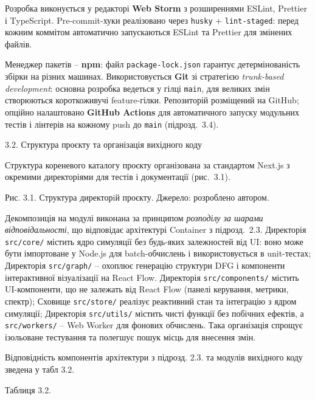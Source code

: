\documentclass[
]{article}
\begin{document}
Розробка виконується у редакторі \textbf{Web Storm} з розширеннями
ESLint, Prettier і TypeScript. Pre-commit-хуки реалізовано через
\texttt{husky} + \texttt{lint-staged}: перед кожним коммітом автоматично
запускаються ESLint та Prettier для змінених файлів.

Менеджер пакетів -- \textbf{npm}: файл \texttt{package-lock.json} гарантує
детермінованість збірки на різних машинах. Використовується \textbf{Git}
зі стратегією \emph{trunk-based development}: основна розробка ведеться
у гілці \texttt{main}, для великих змін створюються короткоживучі
feature-гілки. Репозиторій розміщений на GitHub; опційно налаштовано
\textbf{GitHub Actions} для автоматичного запуску модульних тестів і
лінтерів на кожному push до \texttt{main} (підрозд.~3.4).

\protect{}\label{_Toc229681128}{}3.2. Структура проєкту та
організація вихідного коду

Структура кореневого каталогу проєкту організована за стандартом Next.js
з окремими директоріями для тестів і документації (рис.~3.1).

Рис. 3.1. Структура директорiй проєкту. Джерело: розроблено автором.

Декомпозиція на модулі виконана за принципом \emph{розподілу за шарами
відповідальності}, що відповідає архітектурі Container з підрозд.~2.3.
Директорія \texttt{src}\texttt{/}\texttt{core}\texttt{/} містить ядро
симуляції без будь-яких залежностей від UI: воно може бути імпортоване у
Node.js для batch-обчислень і використовується в unit-тестах; Директорія
\texttt{src}\texttt{/}\texttt{graph}\texttt{/} -- охоплює генерацію
структури DFG і компоненти інтерактивної візуалізації на React Flow.
Директорія \texttt{src}\texttt{/}\texttt{components}\texttt{/} містить
UI-компоненти, що не залежать від React Flow (панелі керування, метрики,
спектр); Сховище \texttt{src}\texttt{/}\texttt{store}\texttt{/} реалізує
реактивний стан та інтеграцію з ядром симуляції; Директорія
\texttt{src}\texttt{/}\texttt{utils}\texttt{/} містить чисті функції без
побічних ефектів, а \texttt{src}\texttt{/}\texttt{workers}\texttt{/} --
Web Worker для фонових обчислень. Така організація спрощує ізольоване
тестування та полегшує пошук місць для внесення змін.

Відповідність компонентів архітектури з підрозд. 2.3. та модулів
вихідного коду зведена у табл 3.2.

Таблиця 3.2.
\end{document}
